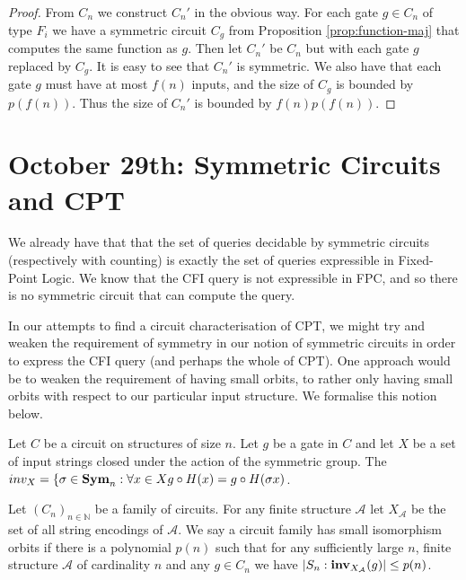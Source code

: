 \documentclass[12pt]{report}
\newcommand{\inv}{\text{\textbf{inv}}}
\newcommand{\sym}{\text{\textbf{Sym}}}
\begin{document}
\begin{proof}
  From $C_n$ we construct $C_n'$ in the obvious way. For each gate $g \in C_n$
  of type $F_i$ we have a symmetric circuit $C_g$ from Proposition
  \ref{prop:function-maj} that computes the same function as $g$. Then let
  $C_n'$ be $C_n$ but with each gate $g$ replaced by $C_g$. It is easy to see
  that $C_n'$ is symmetric. We also have that each gate $g$ must have at most
  $f(n)$ inputs, and the size of $C_g$ is bounded by $p(f(n))$. Thus the size of
  $C_n'$ is bounded by $f(n)p(f(n))$.
\end{proof}

\chapter{October 29th: Symmetric Circuits and CPT}

We already have that that the set of queries decidable by symmetric
circuits (respectively with counting) is exactly the set of queries
expressible in Fixed-Point Logic. We know that the CFI query is not
expressible in FPC, and so there is no symmetric circuit that can
compute the query. 

In our attempts to find a circuit characterisation of CPT, we might try and weaken the requirement of symmetry in our notion of symmetric circuits in order to express the CFI query (and perhaps the whole of CPT). One approach would be to weaken the requirement of having small orbits, to rather only having small orbits with respect to our particular input structure. We formalise this notion below.


\begin{definition}
Let $C$ be a circuit on structures of size $n$. Let $g$ be a gate in $C$ and let $X$ be a set of input strings closed under the action of the symmetric group. The $inv_X = \{ \sigma \in \sym_n : \forall x \in X g \circ H (x) = g \circ H (\sigma x)$.
\end{definition}
\begin{definition}
  Let $(C_n)_{n \in \mathbb{N}}$ be a family of circuits. For any
  finite structure $\mathcal{A}$ let $X_{\mathcal{A}}$ be the set of
  all string encodings of $\mathcal{A}$. We say a circuit family has
  small isomorphism orbits if there is a polynomial $p(n)$ such that
  for any sufficiently large $n$, finite structure $\mathcal{A}$ of
  cardinality $n$ and any $g \in C_n$ we have
  $\vert S_n : \inv_{X_{\mathcal{A}}}(g) \vert \leq p(n)$.
\end{definition}
\end{document}

